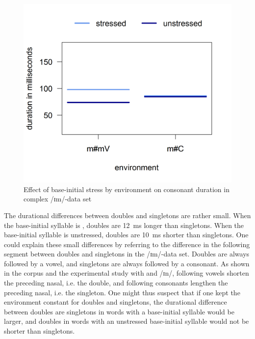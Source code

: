  \begin{figure}
 	
 	\includegraphics [scale=0.5] {images/Experiment/imModelInterEnvStress}
 	\caption{Effect of base-initial stress by environment on consonant duration in complex /ɪm/-data set}
 	\label{fig:NumNasal imComplex experiment}
 	
 \end{figure}



The durational differences between doubles and singletons are rather small.  When the base-initial syllable is , doubles are 12~ms longer than singletons. When the base-initial syllable is unstressed, doubles are 10~ms shorter than singletons. 
  One could explain these small differences by referring to the difference in the following segment between doubles and singletons in the /ɪm/-data set. Doubles are always followed by a vowel, and singletons are always followed by a consonant. As shown in the corpus and the experimental study with  and /ɪn/, following vowels shorten the preceding nasal, i.e. the double, and following consonants lengthen the preceding nasal, i.e. the singleton. One might thus suspect that if one kept the environment constant for doubles and singletons, the durational difference between doubles are singletons in words with a  base-initial syllable would be larger, and doubles in words with an unstressed base-initial syllable would not be shorter than singletons. 

